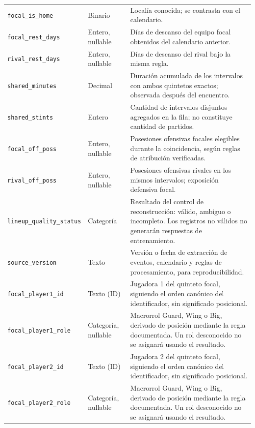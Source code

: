 \begin{longtable}{@{}>{\raggedright\arraybackslash}p{5.0cm}>{\raggedright\arraybackslash}p{1.9cm}>{\raggedright\arraybackslash}p{7.7cm}@{}}
\texttt{focal\_\allowbreak is\_\allowbreak home} & Binario & Localía conocida; se contrasta con el calendario.\\
\texttt{focal\_\allowbreak rest\_\allowbreak days} & Entero, nullable & Días de descanso del equipo focal obtenidos del calendario anterior.\\
\texttt{rival\_\allowbreak rest\_\allowbreak days} & Entero, nullable & Días de descanso del rival bajo la misma regla.\\
\texttt{shared\_\allowbreak minutes} & Decimal & Duración acumulada de los intervalos con ambos quintetos exactos; observada después del encuentro.\\
\texttt{shared\_\allowbreak stints} & Entero & Cantidad de intervalos disjuntos agregados en la fila; no constituye cantidad de partidos.\\
\texttt{focal\_\allowbreak off\_\allowbreak poss} & Entero, nullable & Posesiones ofensivas focales elegibles durante la coincidencia, según reglas de atribución verificadas.\\
\texttt{rival\_\allowbreak off\_\allowbreak poss} & Entero, nullable & Posesiones ofensivas rivales en los mismos intervalos; exposición defensiva focal.\\
\texttt{lineup\_\allowbreak quality\_\allowbreak status} & Categoría & Resultado del control de reconstrucción: válido, ambiguo o incompleto. Los registros no válidos no generarán respuestas de entrenamiento.\\
\texttt{source\_\allowbreak version} & Texto & Versión o fecha de extracción de eventos, calendario y reglas de procesamiento, para reproducibilidad.\\
\texttt{focal\_\allowbreak player1\_\allowbreak id} & Texto (ID) & Jugadora 1 del quinteto focal, siguiendo el orden canónico del identificador, sin significado posicional.\\
\texttt{focal\_\allowbreak player1\_\allowbreak role} & Categoría, nullable & Macrorrol Guard, Wing o Big, derivado de posición mediante la regla documentada. Un rol desconocido no se asignará usando el resultado.\\
\texttt{focal\_\allowbreak player2\_\allowbreak id} & Texto (ID) & Jugadora 2 del quinteto focal, siguiendo el orden canónico del identificador, sin significado posicional.\\
\texttt{focal\_\allowbreak player2\_\allowbreak role} & Categoría, nullable & Macrorrol Guard, Wing o Big, derivado de posición mediante la regla documentada. Un rol desconocido no se asignará usando el resultado.\\

\end{longtable}
